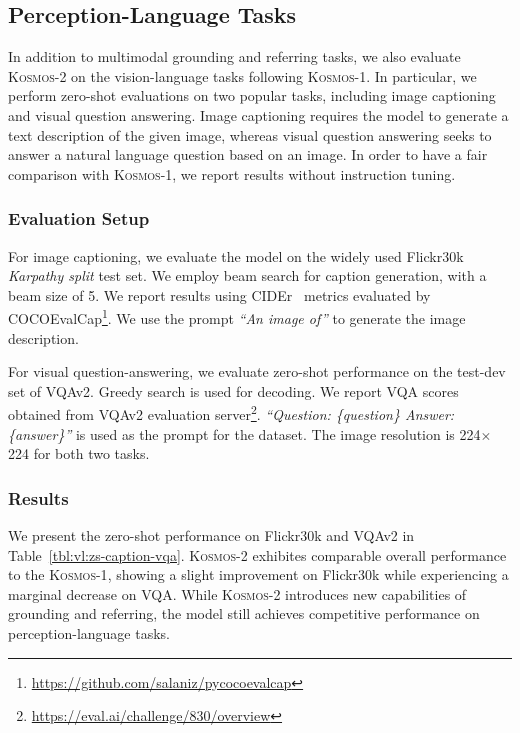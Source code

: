\documentclass{article}
\newcommand\kosmos{\textsc{Kosmos-1}}
\newcommand\our{\textsc{Kosmos-2}}
\begin{document}
\subsection{Perception-Language Tasks}
\label{sec:eval:vl}


In addition to multimodal grounding and referring tasks, we also evaluate \our{} on the vision-language tasks following \kosmos{}.
In particular, we perform zero-shot evaluations on two popular tasks, including image captioning and visual question answering.
Image captioning requires the model to generate a text description of the given image, whereas visual question answering seeks to answer a natural language question based on an image.
In order to have a fair comparison with \kosmos{}, we report results without instruction tuning.


\subsubsection{Evaluation Setup}

For image captioning, we evaluate the model on the widely used Flickr30k \textit{Karpathy split} test set.
We employ beam search for caption generation, with a beam size of 5.
We report results using CIDEr~\cite{cider} metrics evaluated by COCOEvalCap\footnote{\url{https://github.com/salaniz/pycocoevalcap}}.
We use the prompt \textit{``An image of''} to generate the image description.

For visual question-answering, we evaluate zero-shot performance on the test-dev set of VQAv2.
Greedy search is used for decoding.
We report VQA scores obtained from VQAv2 evaluation server\footnote{\url{https://eval.ai/challenge/830/overview}}.
\textit{``Question: \{question\} Answer: \{answer\}''} is used as the prompt for the dataset.
The image resolution is 224$\times$224 for both two tasks.

\subsubsection{Results}


We present the zero-shot performance on Flickr30k and VQAv2 in Table~\ref{tbl:vl:zs-caption-vqa}.
\our{} exhibites comparable overall performance to the \kosmos{}, showing a slight improvement on Flickr30k while experiencing a marginal decrease on VQA.
While \our{} introduces new capabilities of grounding and referring, the model still achieves competitive performance on perception-language tasks.
\end{document}
